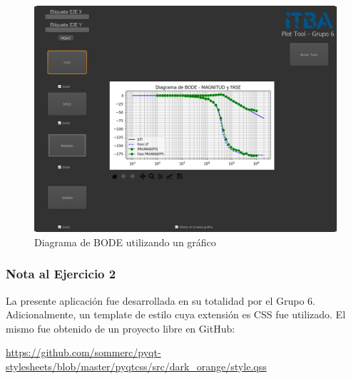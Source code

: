 \begin{figure}[!htb] 
    \centering 
    \includegraphics [width=0.8
    \textwidth] {../EJ2/LatexScreenshots/plotToolUnGrafico.png} 
    \caption{Diagrama de BODE utilizando un gráfico}
    \label{fig:checkBoxPlotTool}
\end{figure}

\subsubsection{Nota al Ejercicio 2}

La presente aplicación fue desarrollada en su totalidad por el Grupo 6. Adicionalmente, un template de estilo cuya extensión es CSS fue utilizado. El mismo fue obtenido de un proyecto libre en GitHub:

\url{https://github.com/sommerc/pyqt-stylesheets/blob/master/pyqtcss/src/dark_orange/style.qss}